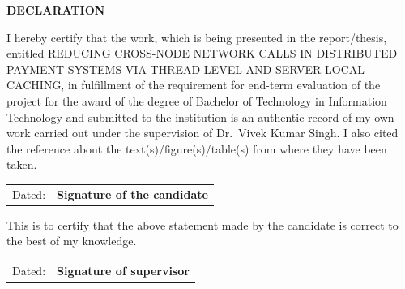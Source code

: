 \begin{center}
{\Large \bf DECLARATION}
\end{center}
\vspace{0.5cm}
\noindent I hereby certify that the work, which is being presented in the report/thesis, entitled REDUCING CROSS-NODE NETWORK CALLS IN DISTRIBUTED PAYMENT SYSTEMS VIA THREAD-LEVEL AND SERVER-LOCAL CACHING, in fulfillment of the requirement for end-term evaluation of the project for the award of the degree of Bachelor of Technology in Information Technology and submitted to the institution is an authentic record of my own work carried out under the supervision of Dr.\ Vivek Kumar Singh. I also cited the reference about the text(s)/figure(s)/table(s) from where they have been taken.

\vspace{1cm}

\begin{center}
\begin{tabular}{p{}p{}}
Dated:  & {\bf{Signature of the candidate}} \\
\end{tabular}
\end{center}
\vspace{1.5cm}
\noindent This is to certify that the above statement made by the candidate is correct to the best of my knowledge.

\vspace{1.5cm}

\begin{center}
\begin{tabular}{p{}p{}}
Dated: & {\bf{Signature of supervisor}} \\
\end{tabular}
\end{center}
